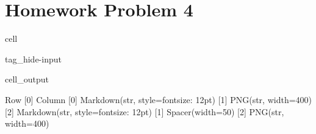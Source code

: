 \documentclass[letterpaper,10pt,english]{jupyterBook}
\begin{document}
\section{Homework Problem 4}
\label{\detokenize{content/tutorials/T3/tutorial_03:homework-problem-4}}
\begin{sphinxuseclass}{cell}
\begin{sphinxuseclass}{tag_hide-input}\begin{sphinxVerbatimOutput}

\begin{sphinxuseclass}{cell_output}
\begin{sphinxVerbatim}[commandchars=\\\{\}]
Row
    [0] Column
        [0] Markdown(str, style=\PYGZob{}\PYGZsq{}font\PYGZhy{}size\PYGZsq{}: \PYGZsq{}12pt\PYGZsq{}\PYGZcb{})
        [1] PNG(str, width=400)
        [2] Markdown(str, style=\PYGZob{}\PYGZsq{}font\PYGZhy{}size\PYGZsq{}: \PYGZsq{}12pt\PYGZsq{}\PYGZcb{})
    [1] Spacer(width=50)
    [2] PNG(str, width=400)
\end{sphinxVerbatim}

\end{sphinxuseclass}\end{sphinxVerbatimOutput}

\end{sphinxuseclass}
\end{sphinxuseclass}
\end{document}
